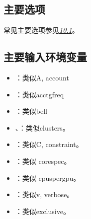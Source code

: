 \documentclass[a4paper,12pt,english]{sphinxmanual}
\begin{document}
\subsection{主要选项}
\label{\detokenize{slurm/slurm:id31}}
\sphinxAtStartPar
常见主要选项参见{\hyperref[\detokenize{slurm/slurm:slurmoption}]{\emph{10.1}}}。


\subsection{主要输入环境变量}
\label{\detokenize{slurm/slurm:id32}}\label{\detokenize{slurm/slurm:id33}}\begin{itemize}
\item {} 
\sphinxAtStartPar
{}：类似\sphinxhyphen{}A, \sphinxhyphen{}\sphinxhyphen{}account

\item {} 
\sphinxAtStartPar
{}：类似\sphinxhyphen{}\sphinxhyphen{}acctg\sphinxhyphen{}freq

\item {} 
\sphinxAtStartPar
{}：类似\sphinxhyphen{}\sphinxhyphen{}bell

\item {} 
\sphinxAtStartPar
{}、：类似\sphinxhyphen{}\sphinxhyphen{}clusters。

\item {} 
\sphinxAtStartPar
{}：类似\sphinxhyphen{}C, \sphinxhyphen{}\sphinxhyphen{}constraint。

\item {} 
\sphinxAtStartPar
{}：类似 \sphinxhyphen{}\sphinxhyphen{}core\sphinxhyphen{}spec。

\item {} 
\sphinxAtStartPar
{}：类似 \sphinxhyphen{}\sphinxhyphen{}cpus\sphinxhyphen{}per\sphinxhyphen{}gpu。

\item {} 
\sphinxAtStartPar
{}：类似\sphinxhyphen{}v, \sphinxhyphen{}\sphinxhyphen{}verbose。

\item {} 
\sphinxAtStartPar
{}：类似\sphinxhyphen{}\sphinxhyphen{}exclusive。


\end{itemize}
\end{document}
